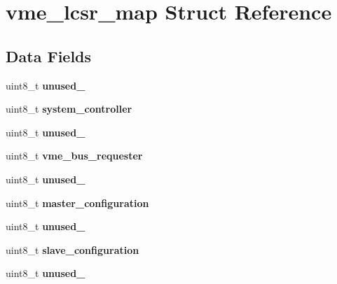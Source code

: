 \hypertarget{structvme__lcsr__map}{}\section{vme\+\_\+lcsr\+\_\+map Struct Reference}
\label{structvme__lcsr__map}
\subsection*{Data Fields}
\begin{DoxyCompactItemize}
\item 
\mbox{\label{structvme__lcsr__map_af13da8764439eff022a7faffafba5a97}} 
uint8\+\_\+t {\bfseries unused\+\_}
\item 
\mbox{\label{structvme__lcsr__map_abf8ca90acbf82ebf4747d46819b8c53f}} 
uint8\+\_\+t {\bfseries system\+\_\+controller}
\item 
\mbox{\label{structvme__lcsr__map_aad444045fa7dbfebd719fa1856b4a517}} 
uint8\+\_\+t {\bfseries unused\+\_}
\item 
\mbox{\label{structvme__lcsr__map_aa6c40caf88e0017e6df6ff3c264bbfeb}} 
uint8\+\_\+t {\bfseries vme\+\_\+bus\+\_\+requester}
\item 
\mbox{\label{structvme__lcsr__map_ab4b2569cb498e3c56ff85f04281356ea}} 
uint8\+\_\+t {\bfseries unused\+\_}
\item 
\mbox{\label{structvme__lcsr__map_ae2f9882d62c1e2edd807145ace99658d}} 
uint8\+\_\+t {\bfseries master\+\_\+configuration}
\item 
\mbox{\label{structvme__lcsr__map_a8ffb19c64aeef3239abb8d3f78ee6c86}} 
uint8\+\_\+t {\bfseries unused\+\_}
\item 
\mbox{\label{structvme__lcsr__map_a9be2a9bb315face35b7685bcbb99b3f4}} 
uint8\+\_\+t {\bfseries slave\+\_\+configuration}
\item 
\mbox{\label{structvme__lcsr__map_a852474861ff93d2d9675d549be03f6f8}} 
uint8\+\_\+t {\bfseries unused\+\_}

\end{DoxyCompactItemize}

